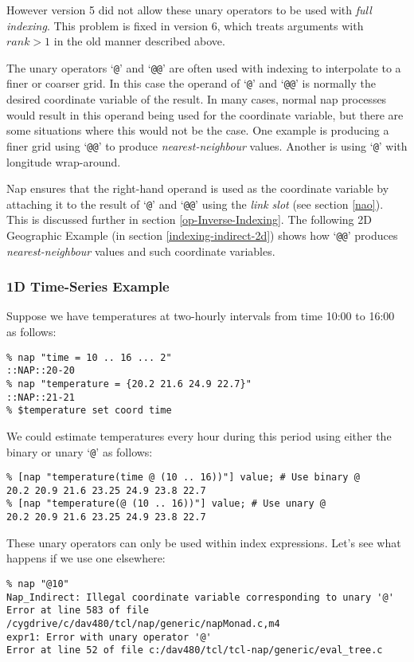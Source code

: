 However version 5 did not allow these unary operators to be used with \emph{full indexing}.
This problem is fixed in version 6, which treats arguments with $rank>1$ in the old manner
described above.

The unary operators `\texttt{@}' and `\texttt{@@}' are often used with
indexing to interpolate to
a finer or coarser grid.
In this case the operand of `\texttt{@}' and `\texttt{@@}' is normally
the desired coordinate variable of the result.
In many cases, normal nap processes would result in this operand being used for the
coordinate variable, but there are some situations where this would not be the case.
One example is producing a finer grid using `\texttt{@@}' to produce 
\emph{nearest-neighbour} values.
Another is using `\texttt{@}' with longitude wrap-around.

Nap ensures that the right-hand operand is used as the coordinate
variable by attaching it to the result of `\texttt{@}'
and `\texttt{@@}' using the \emph{link slot} (see section \ref{nao}).
This is discussed further in section \ref{op-Inverse-Indexing}.
The following 2D Geographic Example (in section \ref{indexing-indirect-2d})
shows how `\texttt{@@}' produces \emph{nearest-neighbour} values and such coordinate variables.

\subsubsection{1D Time-Series Example}
    \label{indexing-indirect-1d}

Suppose we have temperatures at two-hourly intervals from time
  10:00 to 16:00 as follows:
  \begin{verbatim}
% nap "time = 10 .. 16 ... 2"
::NAP::20-20
% nap "temperature = {20.2 21.6 24.9 22.7}"
::NAP::21-21
% $temperature set coord time
\end{verbatim}

We could estimate temperatures every hour during this period
using either the binary or unary `\texttt{@}' as follows:
  \begin{verbatim}
% [nap "temperature(time @ (10 .. 16))"] value; # Use binary @
20.2 20.9 21.6 23.25 24.9 23.8 22.7
% [nap "temperature(@ (10 .. 16))"] value; # Use unary @
20.2 20.9 21.6 23.25 24.9 23.8 22.7
\end{verbatim}

  

These unary operators can only be used within index expressions.
  Let's see what happens if we use one elsewhere:
  \begin{verbatim}
% nap "@10"
Nap_Indirect: Illegal coordinate variable corresponding to unary '@'
Error at line 583 of file
/cygdrive/c/dav480/tcl/nap/generic/napMonad.c,m4
expr1: Error with unary operator '@'
Error at line 52 of file c:/dav480/tcl/tcl-nap/generic/eval_tree.c
\end{verbatim}

